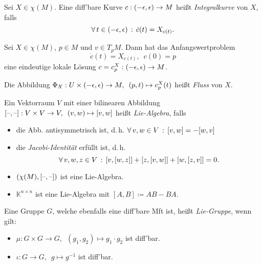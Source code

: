 \documentclass{cheat-sheet}
\newcommand{\K}{\mathbb{K}} %
\begin{document}

\begin{defn}
  Sei $X \in \chi(M)$. Eine diff'bare Kurve $c : \left( -\epsilon, \epsilon \right) \to M$ heißt \emph{Integralkurve} von $X$, falls
  \[ \forall \, {t \in \left( -\epsilon, \epsilon \right)} \,:\, \dot{c}(t) = X_{c(t)}. \]
\end{defn}

\begin{lem}
  Sei $X \in \chi(M)$, $p \in M$ und $v \in T_p M$. Dann hat das Anfangswertproblem
  \[ \dot{c}(t) = X_{c(t)}, \enspace c(0) = p \]
  eine eindeutige lokale Lösung $c = c_p^X : \left( -\epsilon, \epsilon \right) \to M$.
\end{lem}

\begin{defn}
  Die Abbildung $\Phi_X : U \times \left( -\epsilon, \epsilon \right) \to M, \enspace (p, t) \mapsto c_p^X(t)$ heißt \emph{Fluss} von $X$.
\end{defn}


\begin{defn}
  Ein Vektorraum $V$ mit einer bilinearen Abbildung $[\text{--},\text{--}] : V \times V \to V, \enspace (v, w) \mapsto [v,w]$ heißt \emph{Lie-Algebra}, falls
  \begin{itemize}
    \item die Abb. antisymmetrisch ist, d.\,h. $\forall \, {v, w \in V} \,:\, [v, w] = - [w, v]$
    \item die \emph{Jacobi-Identität} erfüllt ist, d.\,h.
    \[ \forall \, {v,w,z \in V} \,:\, [v, [w, z]] + [z, [v, w]] + [w, [z, v]] = 0. \]
  \end{itemize}
\end{defn}

\begin{bspe}
  \begin{itemize}
    \item $(\chi(M), [\text{--},\text{--}])$ ist eine Lie-Algebra.
    \item $\K^{n \times n}$ ist eine Lie-Algebra mit $[A, B] \coloneqq AB - BA$.
  \end{itemize}
\end{bspe}

\begin{defn}
  Eine Gruppe $G$, welche ebenfalls eine diff'bare Mft ist, heißt \emph{Lie-Gruppe}, wenn gilt:
  \begin{itemize}
    \item $\mu : G \times G \to G, \enspace (g_1, g_2) \mapsto g_1 \cdot g_2$ ist diff'bar.
    \item $\iota : G \to G, \enspace g \mapsto g^{-1}$ ist diff'bar.
  \end{itemize}
\end{defn}
\end{document}
